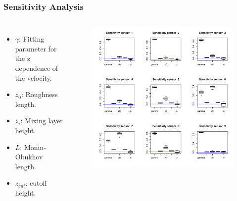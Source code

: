 \documentclass[11pt]{beamer}
\theoremstyle{plain}
\theoremstyle{definition}
\newcommand\ChangeFont{\fontsize{7}{7.2}\selectfont}
\begin{document}
\begin{frame}
\frametitle{Sensitivity Analysis}
\begin{columns}[c]
\ChangeFont
\begin{itemize}
\item $\gamma$: Fitting parameter for the z dependence of the velocity.
\item $z_{0}$: Roughness length.
\item $z_{i}$: Mixing layer height.
\item $L$: Monin-Obukhov length.
\item $z_{cut}$: cutoff height.
\end{itemize}

\column{2.5in}
\begin{figure}
\includegraphics[scale=0.35]{../FigChap4/sensitivityPlot.pdf}
\end{figure}
\end{columns}

\end{frame}
\end{document}
